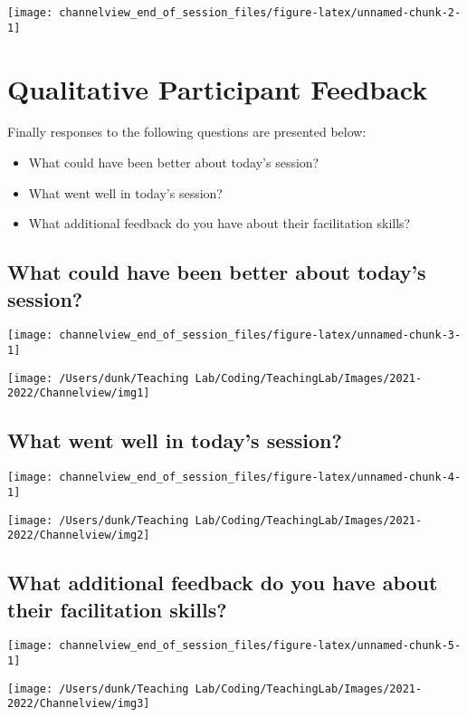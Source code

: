 \documentclass[10,a4paperpaper,]{article}
\begin{document}
\begin{center}\texttt{[image: channelview\_end\_of\_session\_files/figure-latex/unnamed-chunk-2-1]} \end{center}

\section{Qualitative Participant Feedback}

Finally responses to the following questions are presented below:

\begin{itemize}
\item
  What could have been better about today's session?
\item
  What went well in today's session?
\item
  What additional feedback do you have about their facilitation skills?
\end{itemize}

\subsection{What could have been better about today's session?}

\begin{center}\texttt{[image: channelview\_end\_of\_session\_files/figure-latex/unnamed-chunk-3-1]} \end{center}

\begin{center}\texttt{[image: /Users/dunk/Teaching Lab/Coding/TeachingLab/Images/2021-2022/Channelview/img1]} \end{center}

\subsection{What went well in today's session?}

\begin{center}\texttt{[image: channelview\_end\_of\_session\_files/figure-latex/unnamed-chunk-4-1]} \end{center}

\begin{center}\texttt{[image: /Users/dunk/Teaching Lab/Coding/TeachingLab/Images/2021-2022/Channelview/img2]} \end{center}

\subsection{What additional feedback do you have about their facilitation skills?}

\begin{center}\texttt{[image: channelview\_end\_of\_session\_files/figure-latex/unnamed-chunk-5-1]} \end{center}

\begin{center}\texttt{[image: /Users/dunk/Teaching Lab/Coding/TeachingLab/Images/2021-2022/Channelview/img3]} \end{center}
\end{document}
